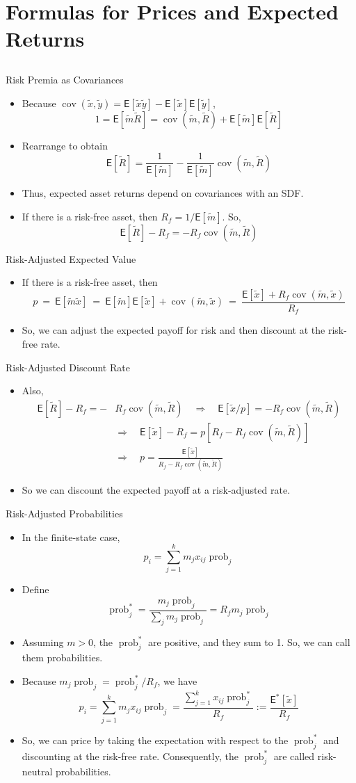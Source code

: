 \documentclass[10pt]{beamer}
\DeclareMathOperator{\cov}{cov}
\DeclareMathOperator{\prob}{prob}
\newcommand{\bi}{\begin{itemize}}
\newcommand{\ei}{\end{itemize}}
\newcommand{\im}{\item}
\newcommand{\mye}{\ensuremath{\mathsf{E}}}
\newcommand{\tx}{\tilde{x}}
\newcommand{\ty}{\tilde{y}}
\newcommand{\tm}{\tilde{m}}
\newcommand{\tr}{\widetilde{R}}
\begin{document}
\section{Formulas for Prices and Expected Returns}
\subsection{}


\begin{frame}{Risk Premia as Covariances}
\bi 
\im Because $\cov(\tx,\ty) = \mye[\tx\ty] - \mye[\tx]\mye[\ty]$,
$$1 = \mye[\tm\tr] = \cov(\tm,\tr) + \mye[\tm]\mye[\tr]$$
\im Rearrange to obtain
$$\mye[\tr] = \frac{1}{\mye[\tm]} - \frac{1}{\mye[\tm]}\cov(\tm,\tr)$$
\im Thus, expected asset returns depend on covariances with an SDF.
\im If there is a risk-free asset, then $R_f = 1/\mye[\tm]$.  So,
$$\mye[\tr]-R_f = - R_f\cov(\tm,\tr)$$
\ei
\end{frame}

\begin{frame}{Risk-Adjusted Expected Value}
\bi 
\im 
If there is a risk-free asset, then
$$p \ = \ \mye[\tilde{m}\tilde{x}]  \ = \ \mye[\tilde{m}]\mye[\tilde{x}]+ \cov(\tilde{m},\tilde{x})
\ = \ \frac{\mye[\tilde{x}] + R_f\cov(\tilde{m},\tilde{x})}{R_f}$$
\im So, we can adjust the expected payoff for risk and then discount at the risk-free rate.
\ei 
\end{frame}

\begin{frame}{Risk-Adjusted Discount Rate}
    \bi 
    \im
Also,
\begin{align*}
    \mye[\tr]-R_f = - & R_f\cov(\tm,\tr)\quad 
    \Rightarrow \quad     \mye[\tx/p] = - R_f\cov(\tm,\tr) \\
    &\Rightarrow \quad \mye[\tx]-R_f =p\left[R_f- R_f\cov(\tm,\tr)\right] \\  
     &\Rightarrow \quad p= \frac{\mye[\tilde{x}]}{R_f - R_f\cov(\tilde{m},\tilde{R})}
\end{align*}
\im So we can discount the expected payoff at a risk-adjusted rate. 
\ei 
\end{frame}

\begin{frame}{Risk-Adjusted Probabilities}
\bi 
\im In the finite-state case,
$$p_i = \sum_{j=1}^k m_j x_{ij}\prob_j$$
\im Define
$$\prob^*_j =  \frac{m_j\prob_j}{\sum_j m_j \prob_j} = R_f m_j \prob_j$$
\im Assuming $m>0$, the $\prob^*_j$ are positive, and they sum to 1.  So, we can call them probabilities.
\im Because $m_j\prob_j = \prob^*_j/R_f$, we have
$$p_i = \sum_{j=1}^k m_j x_{ij}\prob_j = \frac{\sum_{j=1}^k x_{ij}\prob^*_j}{R_f} := \frac{\mye^*[\tx]}{R_f}$$
\im So, we can price by taking the expectation with respect to the $\prob^*_j$ and discounting at the risk-free rate.  Consequently, the $\prob^*_j$ are called \alert{risk-neutral probabilities}.
\ei
\end{frame}
\end{document}
